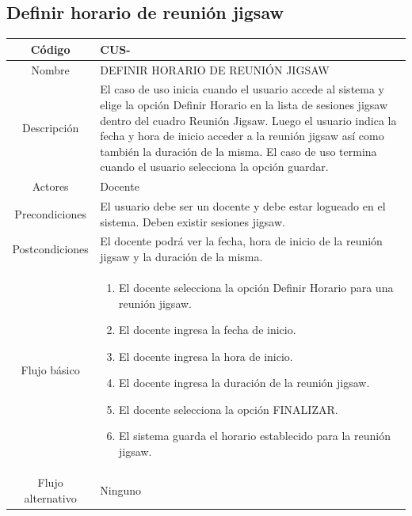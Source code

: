 \subsection{Definir horario de reunión jigsaw}
\begin{longtable}{|c|L{10cm}|}
	\hline
	Código &  CUS-\casodeuso\\  \hline
	Nombre &  DEFINIR HORARIO DE REUNIÓN JIGSAW\\  \hline
	Descripción & El caso de uso inicia cuando el usuario accede al sistema y elige la opción Definir Horario en la lista de sesiones jigsaw dentro del cuadro Reunión Jigsaw. Luego el usuario indica la fecha y hora de inicio acceder a la reunión jigsaw así como también la duración de la misma. El caso de uso termina cuando el usuario selecciona la opción guardar. \\  \hline
	Actores &  Docente\\  \hline
	Precondiciones & El usuario debe ser un docente y debe estar logueado en el sistema. Deben existir sesiones jigsaw. \\  \hline
	Postcondiciones & El docente podrá ver la fecha, hora de inicio de la reunión jigsaw y la duración de la misma. \\  \hline
	Flujo básico & \begin{enumerate}
		\item El docente selecciona la opción Definir Horario para una reunión jigsaw.
		\item El docente ingresa la fecha de inicio.
		\item El docente ingresa la hora de inicio.
		\item El docente ingresa la duración de la reunión jigsaw.
		\item El docente selecciona la opción FINALIZAR.
		\item El sistema guarda el horario establecido para la reunión jigsaw.
	\end{enumerate}
	\\  \hline
	Flujo alternativo & Ninguno \\  \hline
\end{longtable}
\clearpage
